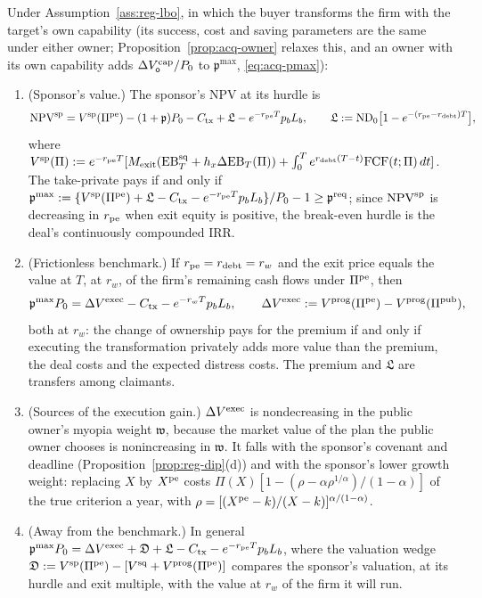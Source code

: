 \begin{proposition}\label{prop:reg-lbo}
Under Assumption~\ref{ass:reg-lbo}, in which the buyer transforms the firm with the target's own capability (its success, cost and saving parameters are the same under either owner; Proposition~\ref{prop:acq-owner} relaxes this, and an owner with its own capability adds $\Delta V^{\rm cap}_{\mathsf o}/P_0$ to $\mathfrak p^{\max}$, \eqref{eq:acq-pmax}):
\begin{enumerate}
\item[(a)] (Sponsor's value.) The sponsor's NPV at its hurdle is
\begin{equation}\label{eq:reg-lbo}
\mathrm{NPV}^{\rm sp}=V^{\rm sp}(\Pi^{\rm pe})-(1+\mathfrak p)P_0-C_{\rm tx}+\mathfrak L-e^{-r_{\rm pe}T}p_bL_b,\qquad \mathfrak L:=\mathrm{ND}_0\bigl[1-e^{-(r_{\rm pe}-r_{\rm debt})T}\bigr],
\end{equation}
where $V^{\rm sp}(\Pi):=e^{-r_{\rm pe}T}[M_{\rm exit}(\mathrm{EB}^{\rm sq}_T+h_x\Delta\mathrm{EB}_T(\Pi))+\int_0^Te^{r_{\rm debt}(T-t)}\mathrm{FCF}(t;\Pi)\,dt]$. The take-private pays if and only if $\mathfrak p^{\max}:=\{V^{\rm sp}(\Pi^{\rm pe})+\mathfrak L-C_{\rm tx}-e^{-r_{\rm pe}T}p_bL_b\}/P_0-1\ge\mathfrak p^{\rm req}$; since $\mathrm{NPV}^{\rm sp}$ is decreasing in $r_{\rm pe}$ when exit equity is positive, the break-even hurdle is the deal's continuously compounded IRR.
\item[(b)] (Frictionless benchmark.) If $r_{\rm pe}=r_{\rm debt}=r_w$ and the exit price equals the value at $T$, at $r_w$, of the firm's remaining cash flows under $\Pi^{\rm pe}$, then
\begin{equation}\label{eq:reg-exec}
\mathfrak p^{\max}P_0=\Delta V^{\rm exec}-C_{\rm tx}-e^{-r_wT}p_bL_b,\qquad \Delta V^{\rm exec}:=V^{\rm prog}(\Pi^{\rm pe})-V^{\rm prog}(\Pi^{\rm pub}),
\end{equation}
both at $r_w$: the change of ownership pays for the premium if and only if executing the transformation privately adds more value than the premium, the deal costs and the expected distress costs. The premium and $\mathfrak L$ are transfers among claimants.
\item[(c)] (Sources of the execution gain.) $\Delta V^{\rm exec}$ is nondecreasing in the public owner's myopia weight $\mathfrak w$, because the market value of the plan the public owner chooses is nonincreasing in $\mathfrak w$. It falls with the sponsor's covenant and deadline (Proposition~\ref{prop:reg-dip}(d)) and with the sponsor's lower growth weight: replacing $X$ by $X^{\rm pe}$ costs $\Pi(X)[1-(\rho-\alpha\rho^{1/\alpha})/(1-\alpha)]$ of the true criterion a year, with $\rho=[(X^{\rm pe}-k)/(X-k)]^{\alpha/(1-\alpha)}$.
\item[(d)] (Away from the benchmark.) In general $\mathfrak p^{\max}P_0=\Delta V^{\rm exec}+\mathfrak D+\mathfrak L-C_{\rm tx}-e^{-r_{\rm pe}T}p_bL_b$, where the valuation wedge $\mathfrak D:=V^{\rm sp}(\Pi^{\rm pe})-[V^{\rm sq}+V^{\rm prog}(\Pi^{\rm pe})]$ compares the sponsor's valuation, at its hurdle and exit multiple, with the value at $r_w$ of the firm it will run.
\end{enumerate}
\end{proposition}

